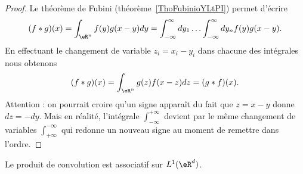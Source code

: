 \begin{proof}
	Le théorème de Fubini (théorème~\ref{ThoFubinioYLtPI}) permet d'écrire
	\begin{equation}
		(f*g)(x)=\int_{\eR^n}f(y)g(x-y)dy=\int_{-\infty}^{\infty}dy_1\ldots \int_{-\infty}^{\infty}dy_nf(y)g(x-y).
	\end{equation}
	En effectuant le changement de variable \( z_i=x_i-y_i\) dans chacune des intégrales nous obtenons
	\begin{equation}
		(f*g)(x)=\int_{\eR^n}g(z)f(x-z)dz=(g*f)(x).
	\end{equation}
	Attention : on pourrait croire qu'un signe apparaît du fait que \( z=x-y\) donne \( dz=-dy\). Mais en réalité, l'intégrale \( \int_{-\infty}^{+\infty}\) devient par le même changement de variables \( \int_{+\infty}^{-\infty}\) qui redonne un nouveau signe au moment de remettre dans l'ordre.
\end{proof}

\begin{lemma}      \label{LEMooTUMSooSmnlHc}
	Le produit de convolution est associatif sur \( L^1(\eR^d)\).
\end{lemma}

